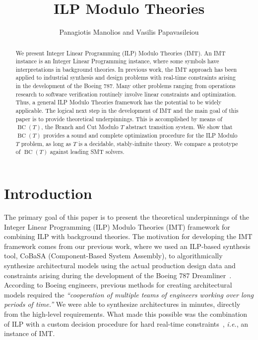 \documentclass{llncs}
\newcommand{\cobasa}[0]{\textsf{CoBaSA}}
\newcommand{\ie}[0]{\emph{i.e.}, }
\newcommand{\bct}[0]{\ensuremath{\operatorname{BC}(T)}}
\begin{document}
\author{Panagiotis Manolios and Vasilis Papavasileiou}


\title{ILP Modulo Theories}

\maketitle

\begin{abstract}
  We present Integer Linear Programming (ILP) Modulo Theories
  (IMT). An IMT instance is an Integer Linear Programming instance,
  where some symbols have interpretations in background theories.  In
  previous work, the IMT approach has been applied to industrial
  synthesis and design problems with real-time constraints arising in
  the development of the Boeing 787. Many other problems ranging from
  operations research to software verification routinely involve
  linear constraints and optimization. Thus, a general ILP Modulo
  Theories framework has the potential to be widely applicable.  The
  logical next step in the development of IMT and the main goal of
  this paper is to provide theoretical underpinnings.  This is
  accomplished by means of \bct{}, the Branch and Cut Modulo $T$
  abstract transition system. We show that \bct{} provides a sound and
  complete optimization procedure for the ILP Modulo $T$ problem, as
  long as $T$ is a decidable, stably-infinite theory. We compare a
  prototype of \bct{} against leading SMT solvers.
\end{abstract}






\section{Introduction}

The primary goal of this paper is to present the theoretical
underpinnings of the Integer Linear Programming (ILP) Modulo Theories
(IMT) framework for combining ILP with background theories. The
motivation for developing the IMT framework comes from our previous
work, where we used an ILP-based synthesis tool, \cobasa{}
(Component-Based System Assembly), to algorithmically synthesize
architectural models using the actual production design data and
constraints arising during the development of the Boeing 787
Dreamliner~\cite{hmp11}. According to Boeing engineers, previous
methods for creating architectural models required the
\emph{``cooperation of multiple teams of engineers working over long
  periods of time.''} We were able to synthesize architectures in
minutes, directly from the high-level requirements. What made this
possible was the combination of ILP with a custom decision procedure
for hard real-time constraints~\cite{hmp11}, \ie an instance of IMT.
\end{document}

